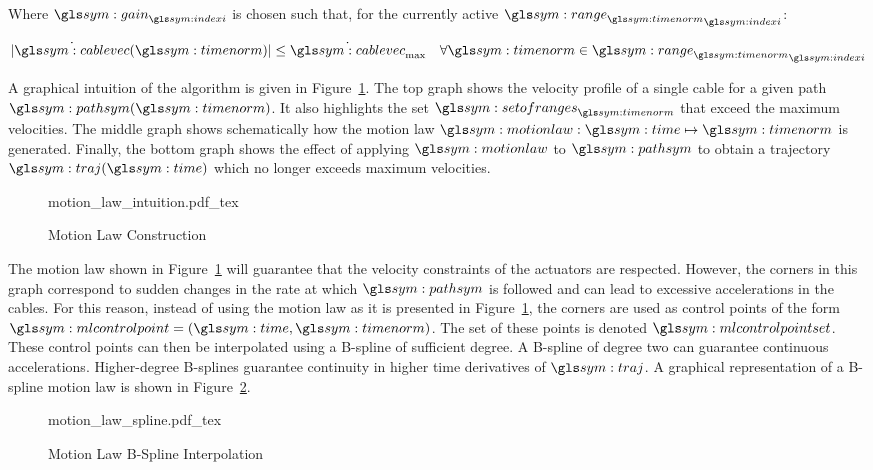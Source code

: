 	Where $\gain_{\indexi}$ is chosen such that, for the currently active
	${\rangetimenorm}_{\indexi}$:

	\begin{equation}
		\abs
		{%
			\dot{\cablevec}(\timenorm)
		}
		\leq \dot{\cablevec}_{\max}
		\quad\forall{\timenorm}\in{\rangetimenorm}_{\indexi}
	\end{equation}

	A graphical intuition of the algorithm is given in
	Figure~\ref{fig:motion_law_graphical_intuition}. The top graph shows the
	velocity profile of a single cable for a given path
	$\pathsym(\timenorm)$. It also highlights the set $\setofrangestimenorm$
	that exceed the maximum velocities. The middle graph shows schematically
	how the motion law $\motionlaw:\timesym \mapsto \timenorm$ is
	generated. Finally, the bottom graph shows the effect of applying
	$\motionlaw$ to $\pathsym$ to obtain a trajectory $\traj(\timesym)$
	which no longer exceeds maximum velocities.

	\begin{figure}[hb]
		\centering
		\def\svgheight{8cm}
		{motion_law_intuition.pdf_tex}
		\caption{Motion Law Construction}%
		\label{fig:motion_law_graphical_intuition}
	\end{figure}

	The motion law shown in Figure~\ref{fig:motion_law_graphical_intuition} will
	guarantee that the velocity constraints of the actuators are respected.
	However, the corners in this graph correspond to sudden changes in the rate
	at which $\pathsym$ is followed and can lead to excessive accelerations in
	the cables. For this reason, instead of using the motion law as it is
	presented in Figure~\ref{fig:motion_law_graphical_intuition}, the corners
	are used as control points of the form $\mlcontrolpoint = \left(\timesym,
	\timenorm\right)$. The set of these points is denoted $\mlcontrolpointset$.
	These control points can then be interpolated using a B-spline of sufficient
	degree. A B-spline of degree two can guarantee continuous accelerations.
	Higher-degree B-splines guarantee continuity in higher time derivatives of
	$\traj$. A graphical representation of a B-spline motion law is shown in
	Figure~\ref{fig:motion_law_spline}.

	\begin{figure}[hb]
		\centering
		\def\svgwidth{\textwidth}
		{motion_law_spline.pdf_tex}
		\caption{Motion Law B-Spline Interpolation}%
		\label{fig:motion_law_spline}
	\end{figure}

